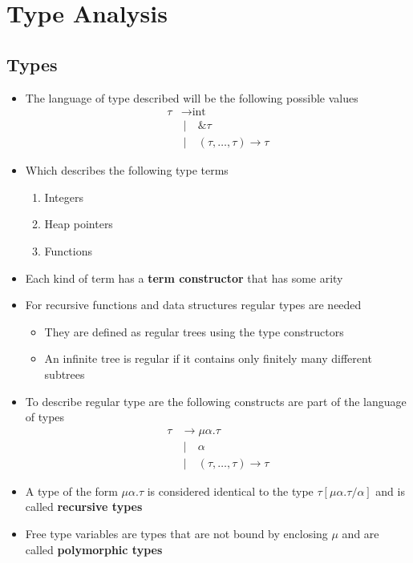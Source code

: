 \section{Type Analysis}
\subsection{Types}
\begin{itemize}
	\item The language of type described will be the following possible values
  \begin{align*}
    \tau &\rightarrow \text{int} \\
         & \: | \quad \& \tau \\
         & \: | \quad (\tau, \dots, \tau) \to \tau
  \end{align*}
  \item Which describes the following type terms
  \begin{enumerate}
  	\item Integers
  	\item Heap pointers
  	\item Functions
  \end{enumerate}
  \item Each kind of term has a \textbf{term constructor} that has some arity
  \item For recursive functions and data structures regular types are needed
  \begin{itemize}
    \item They are defined as regular trees using the type constructors
  	\item An infinite tree is regular if it contains only finitely many different subtrees
  \end{itemize}
  \item To describe regular type are the following constructs are part of the language of types 
  \begin{align*}
    \tau &\rightarrow \mu \alpha. \tau \\
         & \: | \quad \alpha \\
         & \: | \quad (\tau, \dots, \tau) \to \tau
  \end{align*}
  \item A type of the form $\mu \alpha . \tau$ is considered identical to the type $\tau[\mu \alpha . \tau / \alpha]$ and is called \textbf{recursive types}
  \item Free type variables are types that are not bound by enclosing $\mu$ and are called \textbf{polymorphic types}
\end{itemize}

